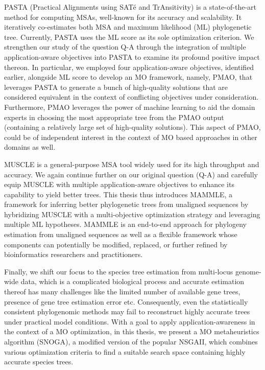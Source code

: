 \begin{spacing}{1.28}
PASTA (Practical Alignments using SAT\'e and TrAnsitivity) is a state-of-the-art method for computing MSAs, well-known for its accuracy and scalability. It iteratively co-estimates both MSA and maximum likelihood (ML) phylogenetic tree. Currently, PASTA uses the ML score as its sole optimization criterion. We strengthen our study of the question Q-A through the integration of multiple application-aware objectives into PASTA to examine its profound positive impact thereon. In particular, we employed four application-aware objectives, identified earlier, alongside ML score to develop an MO framework, namely, PMAO, that leverages PASTA to generate a bunch of high-quality solutions that are considered equivalent in the context of conflicting objectives under consideration. Furthermore, PMAO leverages the power of machine learning to aid the domain experts in choosing the most appropriate tree from the PMAO output (containing a relatively large set of high-quality solutions). This aspect of PMAO, could be of independent interest in the context of MO based approaches in other domains as well. 

MUSCLE is a general-purpose MSA tool widely used for its high throughput and accuracy. We again continue further on our original question (Q-A) and carefully equip MUSCLE with multiple application-aware objectives to enhance its capability to yield better trees. This thesis thus introduces MAMMLE, a framework for inferring better phylogenetic trees from unaligned sequences by hybridizing MUSCLE with a multi-objective optimization strategy and leveraging multiple ML hypotheses. MAMMLE is an end-to-end approach for phylogeny estimation from unaligned sequences as well as a flexible framework whose components can potentially be modified, replaced, or further refined by bioinformatics researchers and practitioners.

Finally, we shift our focus to the species tree estimation from multi-locus genome-wide data, which is a complicated biological process and accurate estimation thereof has many challenges like the limited number of available gene trees, presence of gene tree estimation error etc. Consequently, even the statistically consistent phylogenomic methods may fail to reconstruct highly accurate trees under practical model conditions. With a goal to apply application-awareness in the context of a MO optimization, in this thesis, we present a MO metaheuristics algorithm (SNOGA), a modified version of the popular NSGAII, which combines various optimization criteria to find a suitable search space containing highly accurate species trees. 

\end{spacing}









